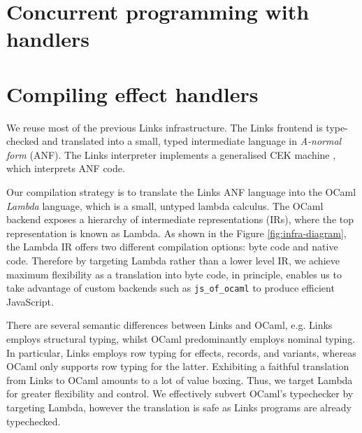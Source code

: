 \documentclass[mscres,cdtppar,twoside,openright,logo,rightchapter,normalheadings]{infthesis}
\theoremstyle{definition}
\begin{document}
\chapter{Concurrent programming with handlers}

\chapter{Compiling effect handlers}
We reuse most of the previous Links infrastructure. The Links frontend
is type-checked and translated into a small, typed intermediate
language in \emph{A-normal form} (ANF). The Links interpreter
implements a generalised CEK machine \cite{Hillerstrom2016}, which
interprets ANF code.

%

Our compilation strategy is to translate the Links ANF language into the OCaml
\emph{Lambda} language, which is a small, untyped lambda calculus. The OCaml
backend exposes a hierarchy of intermediate representations (IRs), where the
top representation is known as Lambda. As shown in the Figure
\ref{fig:infra-diagram}, the Lambda IR offers two different compilation
options: byte code and native code. Therefore by targeting Lambda rather than
a lower level IR, we achieve maximum flexibility as a translation into byte
code, in principle, enables us to take advantage of custom backends such as
\texttt{js\_of\_ocaml} to produce efficient JavaScript.

%

There are several semantic differences between Links and OCaml, e.g. Links
employs structural typing, whilst OCaml predominantly employs nominal typing.
In particular, Links employs row typing for effects, records, and variants,
whereas OCaml only supports row typing for the latter. Exhibiting a faithful
translation from Links to OCaml amounts to a lot of value boxing. Thus, we
target Lambda for greater flexibility and control.  We effectively subvert
OCaml's typechecker by targeting Lambda, however the translation is safe as
Links programs are already typechecked.
\end{document}
